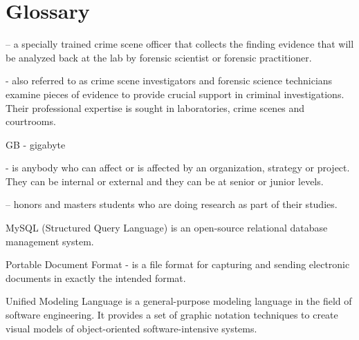 \documentclass[10pt,a4paper]{article}
\begin{document}
\section{Glossary}
\begin{description}
	\item [Forensic officer (FO)] – a specially trained crime scene officer that collects the finding evidence that will be analyzed back at the lab by forensic scientist or forensic practitioner. 
	\item [Forensic practitioner (FP)] - also referred to as crime scene investigators and forensic science technicians examine pieces of evidence to provide crucial support in criminal investigations. Their professional expertise is sought in laboratories, crime scenes and courtrooms.
	\item GB - gigabyte
	\item [Stakeholders] - is anybody who can affect or is affected by an organization, strategy or project. They can be internal or external and they can be at senior or junior levels.
	\item [Students] – honors and masters students who are doing research as part of their studies.
	\item[MySQL] MySQL (Structured Query Language) is an open-source relational database management system.
	
	\item[PDF] Portable Document Format - is a file format for capturing and sending electronic documents in exactly the intended format.
	\item[UML] Unified Modeling Language is a general-purpose modeling language in the field of software engineering. It provides a set of graphic notation techniques to create visual models of object-oriented software-intensive systems. 
	

\end{description}
\end{document}
